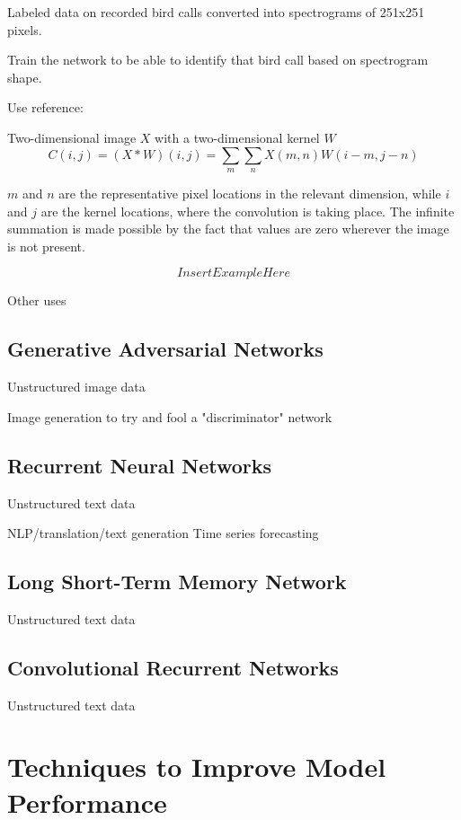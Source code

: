 Labeled data on recorded bird calls converted into spectrograms of 251x251 pixels.

Train the network to be able to identify that bird call based on spectrogram shape.

Use reference: \cite{kahl2017large}

Two-dimensional image $X$ with a two-dimensional kernel $W$
$$
C(i,j) = (X * W)(i,j) = \sum_m \sum_n X(m,n)W(i-m,j-n)
$$

$m$ and $n$ are the representative pixel locations in the relevant dimension, while $i$ and $j$ are the kernel locations, where the convolution is taking place.  The infinite summation is made possible by the fact that values are zero wherever the image is not present.



$$
Insert Example Here
$$


Other uses

\subsection{Generative Adversarial Networks}
Unstructured image data

Image generation to try and fool a "discriminator" network

\subsection{Recurrent Neural Networks}
Unstructured text data

NLP/translation/text generation
Time series forecasting

\subsection{Long Short-Term Memory Network}
Unstructured text data

\subsection{Convolutional Recurrent Networks}
Unstructured text data

\section{Techniques to Improve Model Performance} %

